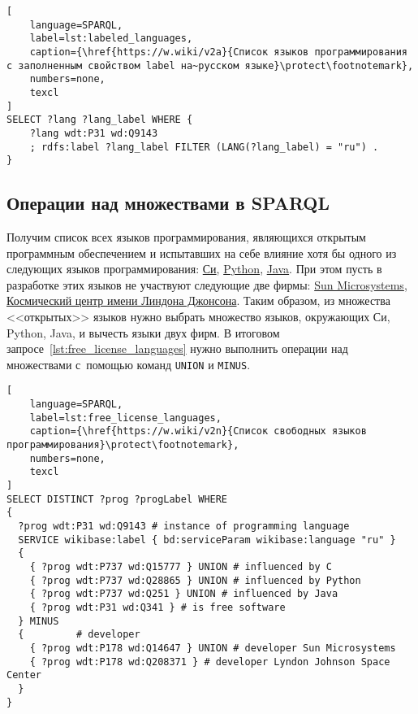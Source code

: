 \newpage
\begin{lstlisting}[
	language=SPARQL,
	label=lst:labeled_languages,
	caption={\href{https://w.wiki/v2a}{Список языков программирования с заполненным свойством label на~русском языке}\protect\footnotemark},
    numbers=none,
	texcl
]
SELECT ?lang ?lang_label WHERE {
    ?lang wdt:P31 wd:Q9143
    ; rdfs:label ?lang_label FILTER (LANG(?lang_label) = "ru") . 
}
\end{lstlisting}




\subsection{Операции над множествами в SPARQL}
Получим список всех языков программирования, 
являющихся открытым программным обеспечением %
и испытавших на себе влияние хотя бы одного из следующих языков программирования: 
\href{https://en.wikipedia.org/wiki/C_(programming_language)}{Си}, 
\href{https://ru.wikipedia.org/wiki/Python}{Python}, 
\href{https://ru.wikipedia.org/wiki/Java}{Java}. 
При этом пусть в разработке этих языков не участвуют следующие две фирмы: 
\href{https://ru.wikipedia.org/wiki/Sun_Microsystems}{Sun Microsystems}, 
\href{https://en.wikipedia.org/wiki/Johnson_Space_Center}{Космический центр имени Линдона Джонсона}. 
Таким образом, из множества <<открытых>> языков 
нужно выбрать множество языков, окружающих Си, Python, Java, 
и вычесть языки двух фирм. 
В итоговом запросе~\ref{lst:free_license_languages} 
нужно выполнить операции над множествами с~помощью команд \texttt{UNION} и \texttt{MINUS}. 


\begin{lstlisting}[
	language=SPARQL,
	label=lst:free_license_languages,
	caption={\href{https://w.wiki/v2n}{Список свободных языков программирования}\protect\footnotemark},
    numbers=none,
	texcl
]
SELECT DISTINCT ?prog ?progLabel WHERE
{
  ?prog wdt:P31 wd:Q9143 # instance of programming language
  SERVICE wikibase:label { bd:serviceParam wikibase:language "ru" } 
  {
    { ?prog wdt:P737 wd:Q15777 } UNION # influenced by C
    { ?prog wdt:P737 wd:Q28865 } UNION # influenced by Python
    { ?prog wdt:P737 wd:Q251 } UNION # influenced by Java
    { ?prog wdt:P31 wd:Q341 } # is free software
  } MINUS
  {         # developer
    { ?prog wdt:P178 wd:Q14647 } UNION # developer Sun Microsystems
    { ?prog wdt:P178 wd:Q208371 } # developer Lyndon Johnson Space Center
  }
}
\end{lstlisting}



